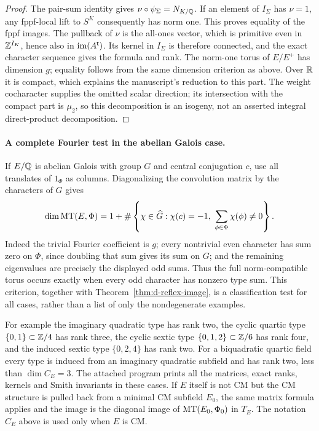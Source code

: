 \begin{proof}
The pair-sum identity gives $\nu\circ\psi_\Sigma=N_{K/\mathbb Q}$.
If an element of $I_\Sigma$ has $\nu=1$, any fppf-local lift to
$S^K$ consequently has norm one.  This proves equality of the
fppf images.  The pullback of $\nu$ is the all-ones vector,
which is primitive even in $\mathbb Z^{I_K}$, hence also in
$\operatorname{im}(A^{\mathsf t})$.  Its kernel in $I_\Sigma$ is therefore
connected, and the exact character sequence gives the formula
and rank.  The norm-one torus of $E/E^+$ has dimension $g$;
equality follows from the same dimension criterion as above.
Over $\mathbb R$ it is compact, which explains the manuscript's reduction
to this part.  The weight cocharacter supplies the omitted scalar
direction; its intersection with the compact part is $\mu_2$,
so this decomposition is an isogeny, not an asserted integral
direct-product decomposition.
\end{proof}

\paragraph{A complete Fourier test in the abelian Galois case.}
If $E/\mathbb Q$ is abelian Galois with group $G$ and central conjugation
$c$, use all translates of $1_\Phi$ as columns.  Diagonalizing the
convolution matrix by the characters of $G$ gives
\[
 \dim\MT(E,\Phi)=1+
 \#\left\{\chi\in\widehat G:\chi(c)=-1,
                         \ \sum_{\phi\in\Phi}\chi(\phi)\ne0\right\}.
\]
Indeed the trivial Fourier coefficient is $g$; every nontrivial
even character has sum zero on $\Phi$, since doubling that sum
gives its sum on $G$; and the remaining eigenvalues are precisely
the displayed odd sums.  Thus the full norm-compatible torus
occurs exactly when every odd character has nonzero type sum.
This criterion, together with Theorem~\ref{thm:d-reflex-image}, is
a classification test for all cases, rather than a list of only
the nondegenerate examples.

For example the imaginary quadratic type has rank two, the cyclic
quartic type $\{0,1\}\subset\mathbb Z/4$ has rank three, the cyclic sextic
type $\{0,1,2\}\subset\mathbb Z/6$ has rank four, and the induced sextic
type $\{0,2,4\}$ has rank two.  For a biquadratic quartic field every
type is induced from an imaginary quadratic subfield and has rank
two, less than $\dim C_E=3$.  The attached program prints all the
matrices, exact ranks, kernels and Smith invariants in these cases.
If $E$ itself is not CM but the CM structure is pulled back from
a minimal CM subfield $E_0$, the same matrix formula applies and
the image is the diagonal image of $\operatorname{MT}(E_0,\Phi_0)$ in $T_E$.
The notation $C_E$ above is used only when $E$ is CM.

